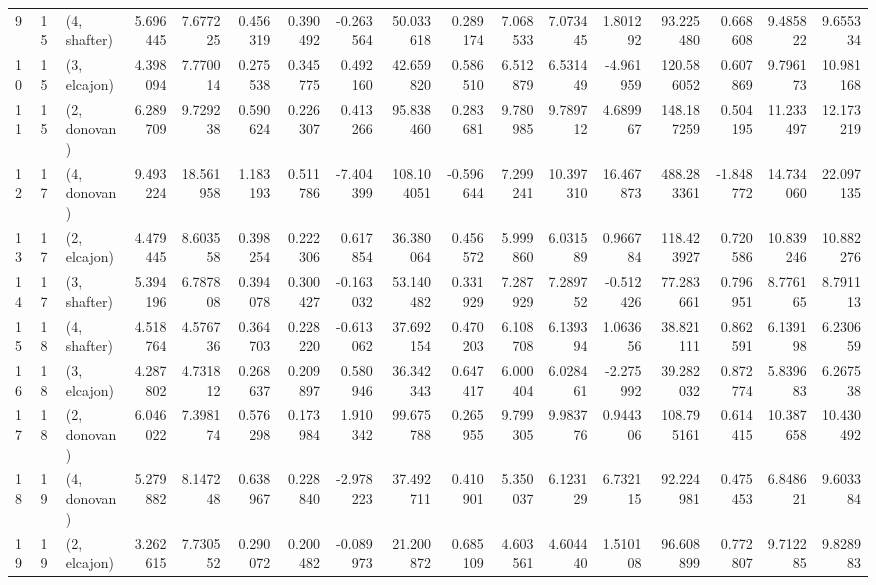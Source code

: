 \begin{tabular}{lllrrrrrrrrrrrrrr}
9  &    15 &  (4, shafter) &   5.696445 &   7.677225 &   0.456319 &  0.390492 & -0.263564 &   50.033618 &  0.289174 &   7.068533 &   7.073445 &   1.801292 &   93.225480 &  0.668608 &   9.485822 &   9.655334 \\
10 &    15 &  (3, elcajon) &   4.398094 &   7.770014 &   0.275538 &  0.345775 &  0.492160 &   42.659820 &  0.586510 &   6.512879 &   6.531449 &  -4.961959 &  120.586052 &  0.607869 &   9.796173 &  10.981168 \\
11 &    15 &  (2, donovan) &   6.289709 &   9.729238 &   0.590624 &  0.226307 &  0.413266 &   95.838460 &  0.283681 &   9.780985 &   9.789712 &   4.689967 &  148.187259 &  0.504195 &  11.233497 &  12.173219 \\
12 &    17 &  (4, donovan) &   9.493224 &  18.561958 &   1.183193 &  0.511786 & -7.404399 &  108.104051 & -0.596644 &   7.299241 &  10.397310 &  16.467873 &  488.283361 & -1.848772 &  14.734060 &  22.097135 \\
13 &    17 &  (2, elcajon) &   4.479445 &   8.603558 &   0.398254 &  0.222306 &  0.617854 &   36.380064 &  0.456572 &   5.999860 &   6.031589 &   0.966784 &  118.423927 &  0.720586 &  10.839246 &  10.882276 \\
14 &    17 &  (3, shafter) &   5.394196 &   6.787808 &   0.394078 &  0.300427 & -0.163032 &   53.140482 &  0.331929 &   7.287929 &   7.289752 &  -0.512426 &   77.283661 &  0.796951 &   8.776165 &   8.791113 \\
15 &    18 &  (4, shafter) &   4.518764 &   4.576736 &   0.364703 &  0.228220 & -0.613062 &   37.692154 &  0.470203 &   6.108708 &   6.139394 &   1.063656 &   38.821111 &  0.862591 &   6.139198 &   6.230659 \\
16 &    18 &  (3, elcajon) &   4.287802 &   4.731812 &   0.268637 &  0.209897 &  0.580946 &   36.342343 &  0.647417 &   6.000404 &   6.028461 &  -2.275992 &   39.282032 &  0.872774 &   5.839683 &   6.267538 \\
17 &    18 &  (2, donovan) &   6.046022 &   7.398174 &   0.576298 &  0.173984 &  1.910342 &   99.675788 &  0.265955 &   9.799305 &   9.983776 &   0.944306 &  108.795161 &  0.614415 &  10.387658 &  10.430492 \\
18 &    19 &  (4, donovan) &   5.279882 &   8.147248 &   0.638967 &  0.228840 & -2.978223 &   37.492711 &  0.410901 &   5.350037 &   6.123129 &   6.732115 &   92.224981 &  0.475453 &   6.848621 &   9.603384 \\
19 &    19 &  (2, elcajon) &   3.262615 &   7.730552 &   0.290072 &  0.200482 & -0.089973 &   21.200872 &  0.685109 &   4.603561 &   4.604440 &   1.510108 &   96.608899 &  0.772807 &   9.712285 &   9.828983 \\

\end{tabular}
